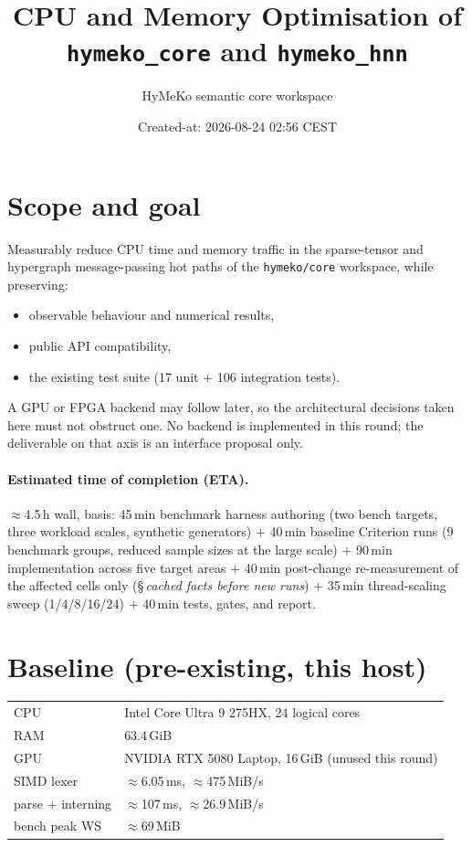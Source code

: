 \documentclass[11pt,a4paper]{article}
\title{CPU and Memory Optimisation of \texttt{hymeko\_core} and \texttt{hymeko\_hnn}}
\author{HyMeKo semantic core workspace}
\date{Created-at: 2026-08-24 02:56 CEST}
\begin{document}
\maketitle

\section{Scope and goal}

Measurably reduce CPU time and memory traffic in the sparse-tensor and
hypergraph message-passing hot paths of the \texttt{hymeko/core} workspace,
while preserving:

\begin{itemize}
  \item observable behaviour and numerical results,
  \item public API compatibility,
  \item the existing test suite (17 unit + 106 integration tests).
\end{itemize}

A GPU or FPGA backend may follow later, so the architectural decisions taken
here must not obstruct one. No backend is implemented in this round; the
deliverable on that axis is an interface proposal only.

\paragraph{Estimated time of completion (ETA).}
$\approx$4.5\,h wall, basis: 45\,min benchmark harness authoring
(two bench targets, three workload scales, synthetic generators)
$+$ 40\,min baseline Criterion runs (9 benchmark groups, reduced sample
sizes at the large scale) $+$ 90\,min implementation across five target
areas $+$ 40\,min post-change re-measurement of the affected cells only
(\S\,\emph{cached facts before new runs}) $+$ 35\,min thread-scaling sweep
(1/4/8/16/24) $+$ 40\,min tests, gates, and report.

\section{Baseline (pre-existing, this host)}

\begin{center}
\begin{tabular}{ll}
\toprule
CPU               & Intel Core Ultra 9 275HX, 24 logical cores \\
RAM               & 63.4\,GiB \\
GPU               & NVIDIA RTX 5080 Laptop, 16\,GiB (unused this round) \\
SIMD lexer        & $\approx$6.05\,ms, $\approx$475\,MiB/s \\
parse + interning & $\approx$107\,ms, $\approx$26.9\,MiB/s \\
bench peak WS     & $\approx$69\,MiB \\
\bottomrule
\end{tabular}
\end{center}
\end{document}

